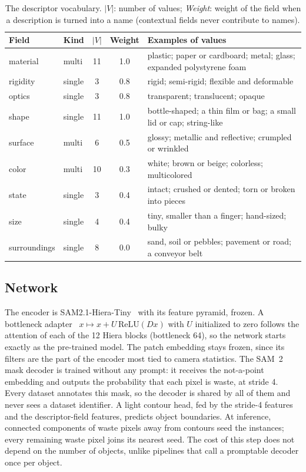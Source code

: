 \documentclass[pdflatex,sn-basic,Numbered]{sn-jnl}%
\begin{document}
\begin{table}[t]
\caption{The descriptor vocabulary. $|V|$: number of values; \emph{Weight}: weight of the field when a description is turned into a name (contextual fields never contribute to names).}\label{tab:schema}
\centering\footnotesize
\begin{tabular}{@{}llccp{5.0cm}@{}}
\toprule
Field & Kind & $|V|$ & Weight & Examples of values\\
\midrule
material & multi & 11 & 1.0 & plastic; paper or cardboard; metal; glass; expanded polystyrene foam\\
rigidity & single & 3 & 0.8 & rigid; semi-rigid; flexible and deformable\\
optics & single & 3 & 0.8 & transparent; translucent; opaque\\
shape & single & 11 & 1.0 & bottle-shaped; a thin film or bag; a small lid or cap; string-like\\
surface & multi & 6 & 0.5 & glossy; metallic and reflective; crumpled or wrinkled\\
color & multi & 10 & 0.3 & white; brown or beige; colorless; multicolored\\
state & single & 3 & 0.4 & intact; crushed or dented; torn or broken into pieces\\
size & single & 4 & 0.4 & tiny, smaller than a finger; hand-sized; bulky\\
surroundings & single & 8 & 0.0 & sand, soil or pebbles; pavement or road; a conveyor belt\\
\bottomrule
\end{tabular}
\end{table}

\subsection{Network}\label{sec:network}
The encoder is SAM2.1-Hiera-Tiny~\cite{ravi2025sam2,ryali2023hiera} with its feature pyramid, frozen. A bottleneck adapter~\cite{houlsby2019adapters} $x\mapsto x + U\,\mathrm{ReLU}(Dx)$ with $U$ initialized to zero follows the attention of each of the 12 Hiera blocks (bottleneck 64), so the network starts exactly as the pre-trained model. The patch embedding stays frozen, since its filters are the part of the encoder most tied to camera statistics. The SAM~2 mask decoder is trained without any prompt: it receives the not-a-point embedding and outputs the probability that each pixel is waste, at stride 4. Every dataset annotates this mask, so the decoder is shared by all of them and never sees a dataset identifier. A light contour head, fed by the stride-4 features and the descriptor-field features, predicts object boundaries. At inference, connected components of waste pixels away from contours seed the instances; every remaining waste pixel joins its nearest seed. The cost of this step does not depend on the number of objects, unlike pipelines that call a promptable decoder once per object.
\end{document}
